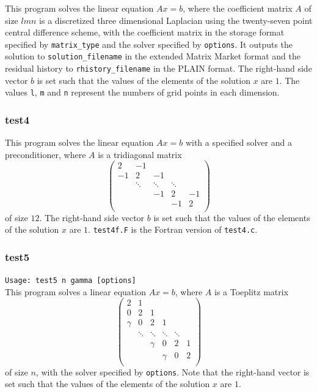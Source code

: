 \documentclass[a4paper]{article}
\begin{document}
This program solves the linear equation $Ax = b$, where the coefficient 
matrix $A$ of size $lmn$ is a discretized three dimensional 
Laplacian using the twenty-seven
point central difference scheme, with the coefficient matrix 
in the storage format specified
by \verb|matrix_type| and the solver specified by {\tt options}. 
It outputs the solution to {\tt solution\_filename} in the extended 
Matrix Market format and 
the residual history to {\tt rhistory\_filename} in the PLAIN format. 
The right-hand side vector $b$ is set such that the values of the elements of the solution $x$ are $1$. 
The values {\tt l}, {\tt m} and {\tt n} represent the numbers of grid
points in each dimension. 

\subsubsection{test4}
This program solves the linear equation $Ax = b$ with a specified 
solver and a preconditioner, where $A$ is a tridiagonal matrix
\[
\left(
\begin{array}{ccccc}
2 & -1 &   &  &   \\
-1 & 2 & -1 &  &   \\
  & \ddots  & \ddots  & \ddots  &   \\
  &   & -1 & 2 & -1 \\
  &   &   & -1 & 2 \\
\end{array}
\right)
\]
of size $12$.
The right-hand side vector $b$ is set such that  
the values of the elements of the solution $x$ are $1$. 
{\tt test4f.F} is the Fortran version of {\tt test4.c}.

\subsubsection{test5}

\verb+Usage: test5 n gamma [options]+\\

This program solves a linear equation $Ax =b$, where $A$ is a Toeplitz matrix
\[
\left(
\begin{array}{cccccc}
2 & 1 &   &  &  & \\
0 & 2 & 1 &  &  & \\
\gamma & 0& 2 & 1 &  & \\
 & \ddots & \ddots & \ddots & \ddots & \\
 &  &   \gamma &0 &       2   & 1 \\
 &  &  &   \gamma & 0& 2 \\
\end{array}
\right)
\]
of size $n$, with the solver specified by {\tt options}. 
Note that the right-hand vector is set such that the values of the elements 
of the solution $x$ are $1$. 
\end{document}
